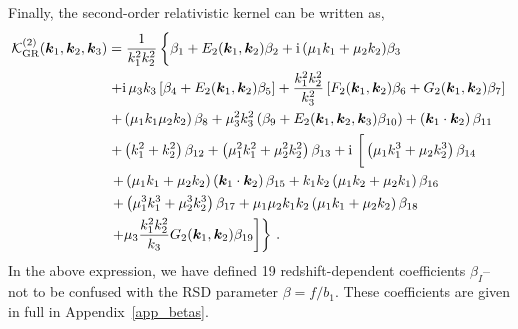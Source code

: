 Finally, the second-order relativistic kernel can be written as, 
\begin{align}
	\ko_\mathrm{GR}^{(2)}(\ka,\kb,\kc) &= \frac{1}{k_1^2 k_2^2} \left\{ \vphantom{\frac{k_1^2 k_2^2}{k_3}} \beta_1 + E_2(\ka,\kb) \beta_2 +\i (\mu_1k_1+\mu_2k_2)\beta_3 \right. \nonumber \\
&\left. + \i \mu_3 k_3\left[ \beta_{4} + E_2(\ka, \kb)\beta_{5}\right] +\frac{k_1^2 k_2^2}{k_3^2} \left[ F_2(\ka,\kb) \beta_{6} + G_2(\ka,\kb) \beta_{7} \right]\right. \nonumber \\
&\left.  + \left( \mu_1 k_1 \mu_2 k_2 \right)\beta_{8} + \mu_3^2 k_3^2 \left(\beta_{9} + E_2(\ka,\kb,\kc) \beta_{10} \right)  + \left(\ka \cdot \kb \right)\beta_{11} \right. \nonumber \\
&\left. + \left( k_1^2 + k_2^2 \right) \beta_{12} + \left( \mu_1^2 k_1^2 + \mu_2^2 k_2^2 \right) \beta_{13} + \i \left[\vphantom{\frac{k_1^2 k_2^2}{k_3}} \left( \mu_1 k_1^3 + \mu_2 k_2^3 \right)\beta_{14} \right. \right. \nonumber \\
&\left. \left. + \left( \mu_1 k_1 + \mu_2 k_2 \right) \left(\ka\cdot\kb \right) \beta_{15} + k_1 k_2 \left(\mu_1 k_2 + \mu_2 k_1 \right) \beta_{16} \right. \right. \nonumber \\
& \left. \left. + \left( \mu_1^3 k_1^3 + \mu_2^3 k_2^3 \right)\beta_{17} + \mu_1 \mu_2 k_1 k_2 \left( \mu_1 k_1 + \mu_2 k_2 \right) \beta_{18} \right. \right. \nonumber \\
& \left. \left. + \mu_3 \frac{k_1^2 k_2^2}{k_3} G_2(\ka,\kb) \beta_{19} \right] \right\}\,.
\end{align}
In the above expression, we have defined 19 redshift-dependent coefficients $\beta_I$-- not to be confused with the RSD parameter $\beta = f / b_1$. These coefficients are given in full in Appendix~\ref{app_betas}. 

